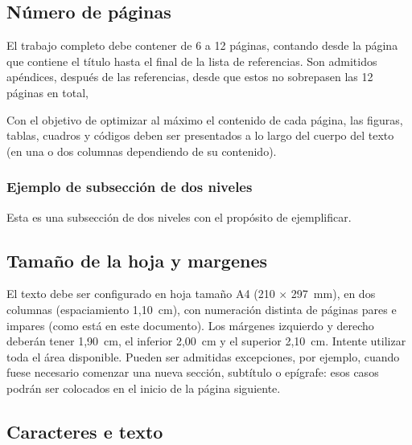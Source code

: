 \documentclass[12pt, a4paper, twoside, twocolumn]{article}
\begin{document}
	
\subsection{Número de páginas}

El trabajo completo debe contener de 6 a 12 páginas, contando desde la página que contiene el título hasta el final de la lista de referencias. Son admitidos apéndices, después de las referencias, desde que estos no sobrepasen las 12 páginas en total,

Con el objetivo de optimizar al máximo el contenido de cada página, las figuras, tablas, cuadros y códigos deben ser presentados a lo largo del cuerpo del texto (en una o dos columnas dependiendo de su contenido).

\subsubsection{Ejemplo de subsección de dos niveles}

Esta es una subsección de dos niveles con el propósito de ejemplificar.

\subsection{Tamaño de la hoja y margenes}

El texto debe ser configurado en hoja tamaño A4 (210 $\times$ 297~mm), en dos columnas (espaciamiento 1,10~cm), con numeración distinta de páginas pares e impares (como está en este documento). Los márgenes izquierdo y derecho deberán tener 1,90~cm, el inferior 2,00~cm  y el superior 2,10~cm. Intente utilizar toda el área disponible. Pueden ser admitidas excepciones, por ejemplo, cuando fuese necesario comenzar una nueva sección, subtítulo o epígrafe: esos casos podrán ser colocados en el inicio de la página siguiente.

\subsection{Caracteres e texto}
\end{document}
